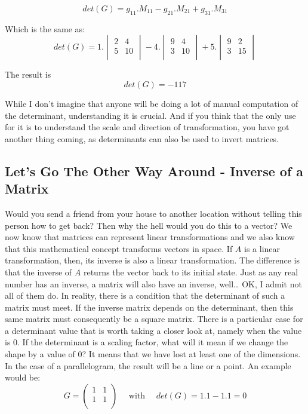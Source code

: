 \documentclass[a4,12pt,twosided,openany]{memoir}
\begin{document}
\[det(G) =  g_{11}.M_{11} - g_{21}.M_{21} + g_{31}.M_{31}\]
\par 
\indent
Which is the same as:
\[det(G) = 1.\begin{vmatrix}
2 & 4\\
5 & 10\\
\end{vmatrix} - 4.\begin{vmatrix}
9 & 4\\
3 & 10\\
\end{vmatrix} +  5.\begin{vmatrix}
9 & 2\\
3 & 15\\
\end{vmatrix}\]
\par 
\indent
The result is 
\[det(G) =  -117\]
\par 
\indent
While I don’t imagine that anyone will be doing a lot of manual computation of the determinant, understanding it is crucial. And if you think that the only use for it is to understand the scale and direction of transformation, you have got another thing coming, as determinants can also be used to invert matrices.
\subsection{Let’s Go The Other Way Around - Inverse of a Matrix}
\par 
\indent
Would you send a friend from your house to another location without telling this person how to get back? Then why the hell  would you do this to a vector? We now know that matrices can represent linear transformations and we also know that this mathematical concept transforms vectors in space. If $A$ is a linear transformation, then, its inverse is also a linear transformation. The difference is that the inverse of $A$ returns the vector back to its initial state. Just as any real number has an inverse, a matrix will also have an inverse, well… OK, I admit not  all of them do. In reality, there is a condition that the determinant of such a matrix must meet. If the inverse matrix depends on the determinant, then this same matrix must consequently be a square matrix. There is a particular case for a determinant value that is worth taking a closer look at, namely when the value is 0. If the determinant is a scaling factor, what will it mean if we change the shape by a value of 0? It means that we have lost at least one of the dimensions. In the case of a parallelogram, the result will be a line or a point. An example would be:
\[
G  = 
\begin{pmatrix}
 1 & 1\\
1 & 1\\
\end{pmatrix} \quad
\text{ with } \quad det(G) = 1.1 - 1.1 = 0
\]
\end{document}
